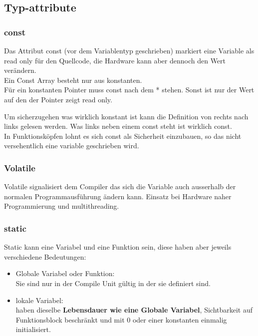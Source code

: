 

\subsection{Typ-attribute}

\subsubsection{const}

Das Attribut const (vor dem Variablentyp geschrieben) markiert eine Variable als read only für den Quellcode, die Hardware kann aber dennoch den Wert verändern.\\
Ein Const Array besteht nur aus konstanten.\\
Für ein konstanten Pointer muss const nach dem * stehen. Sonst ist nur der Wert auf den der Pointer zeigt read only. 



Um sicherzugehen was wirklich konstant ist kann die Definition von rechts nach links gelesen werden. Was links neben einem const steht ist wirklich const.\\

In Funktionsköpfen lohnt es sich const als Sicherheit einzubauen, so das nicht versehentlich eine variable geschrieben wird.



\subsubsection{Volatile}

Volatile signalisiert dem Compiler das sich die Variable auch ausserhalb der normalen Programmausführung ändern kann. Einsatz bei Hardware naher Programmierung und multithreading.

\subsubsection{static} \label{static}

Static kann eine Variabel und eine Funktion sein, diese haben aber jeweils verschiedene Bedeutungen:
\begin{itemize}
    \item Globale Variabel oder Funktion:\\
    Sie sind nur in der Compile Unit gültig in der sie definiert sind.
    \item lokale Variabel:\\
    haben dieselbe \textbf{Lebensdauer wie eine Globale Variabel}, Sichtbarkeit auf Funktionsblock beschränkt und mit 0 oder einer konstanten  einmalig initialisiert. 
\end{itemize}

